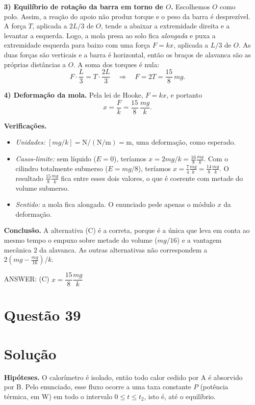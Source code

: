 \documentclass{article}%
\begin{document}
\textbf{3) Equilíbrio de rotação da barra em torno de $O$.} Escolhemos $O$ como polo. Assim, a reação do apoio não produz torque e o peso da barra é desprezível. A força $T$, aplicada a $2L/3$ de $O$, tende a abaixar a extremidade direita e a levantar a esquerda. Logo, a mola presa ao solo fica \emph{alongada} e puxa a extremidade esquerda para baixo com uma força $F=kx$, aplicada a $L/3$ de $O$. As duas forças são verticais e a barra é horizontal, então os braços de alavanca são as próprias distâncias a $O$. A soma dos torques é nula:
\[
F\cdot\frac{L}{3}=T\cdot\frac{2L}{3}\quad\Longrightarrow\quad F=2T=\frac{15}{8}\,mg .
\]

\textbf{4) Deformação da mola.} Pela lei de Hooke, $F=kx$, e portanto
\[
x=\frac{F}{k}=\frac{15}{8}\,\frac{mg}{k}.
\]

\textbf{Verificações.}
\begin{itemize}
\item \emph{Unidades:} $[mg/k]=\mathrm{N}/(\mathrm{N/m})=\mathrm{m}$, uma deformação, como esperado.
\item \emph{Casos-limite:} sem líquido ($E=0$), teríamos $x=2mg/k=\frac{16}{8}\frac{mg}{k}$. Com o cilindro totalmente submerso ($E=mg/8$), teríamos $x=\frac{7}{4}\frac{mg}{k}=\frac{14}{8}\frac{mg}{k}$. O resultado $\frac{15}{8}\frac{mg}{k}$ fica entre esses dois valores, o que é coerente com metade do volume submerso.
\item \emph{Sentido:} a mola fica alongada. O enunciado pede apenas o módulo $x$ da deformação.
\end{itemize}

\textbf{Conclusão.} A alternativa (C) é a correta, porque é a única que leva em conta ao mesmo tempo o empuxo sobre metade do volume ($mg/16$) e a vantagem mecânica $2$ da alavanca. As outras alternativas não correspondem a $2\left(mg-\frac{mg}{16}\right)/k$.

ANSWER: (C) $x=\dfrac{15}{8}\dfrac{mg}{k}$%
\newpage%
\section*{Questão 39}

\section*{Solução}

\textbf{Hipóteses.} O calorímetro é isolado, então todo calor cedido por A é absorvido por B. Pelo enunciado, esse fluxo ocorre a uma taxa constante $P$ (potência térmica, em W) em todo o intervalo $0 \le t \le t_2$, isto é, até o equilíbrio.
\end{document}
